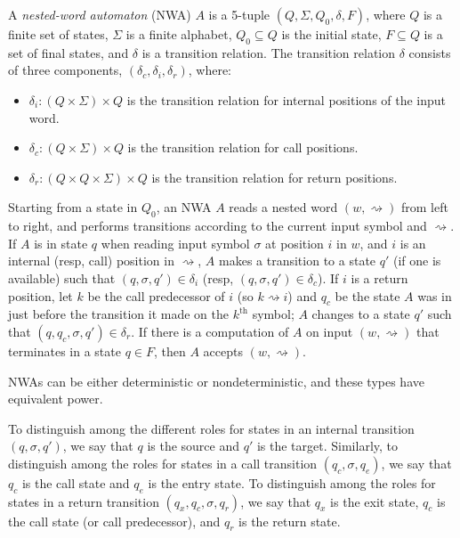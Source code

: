 \begin{definition}
  \label{De:NWA}

  A \textsl{nested-word automaton} (NWA) $A$ is a 5-tuple $(Q, \Sigma, Q_0,
  \delta, F)$, where $Q$ is a finite set of states, $\Sigma$ is a finite
  alphabet, $Q_0 \subseteq Q$ is the initial state, $F \subseteq Q$ is a set of
  final states, and $\delta$ is a transition relation. The transition
  relation $\delta$ consists of three components, $(\delta_c, \delta_i,
  \delta_r)$, where:
  \begin{itemize}
    \item
      $\delta_i: (Q \times \Sigma) \times Q$ is the transition relation for
      internal positions of the input word.
    \item
      $\delta_c: (Q \times \Sigma) \times Q$ is the transition relation for
      call positions.
    \item
      $\delta_r: (Q \times Q \times \Sigma) \times Q$ is the transition
      relation for return positions.
  \end{itemize}

  Starting from a state in $Q_0$, an NWA $A$ reads a nested word $(w,\rightsquigarrow)$
  from left to right, and performs transitions according to the current input
  symbol and $\rightsquigarrow$.  If $A$ is in state $q$ when reading input
  symbol $\sigma$ at position $i$ in $w$, and $i$ is an internal (resp, call)
  position in $\rightsquigarrow$, $A$ makes a transition to a state $q'$ (if
  one is available) such that $(q,\sigma,q')\in\delta_i$ (resp,
  $(q,\sigma,q')\in\delta_c$).  If $i$ is a return position, let $k$ be the
  call predecessor of $i$ (so $k \rightsquigarrow i$) and $q_c$ be the state
  $A$ was in just before the transition it made on the $k^{\textrm{th}}$
  symbol; $A$ changes to a state $q'$ such that $(q,q_c,\sigma,q')
  \in\delta_r$. If there is a computation of $A$ on input
  $(w,\rightsquigarrow)$ that terminates in a state $q\in F$, then $A$
  accepts $(w,\rightsquigarrow)$.

  NWAs can be either deterministic or nondeterministic, and these types have
  equivalent power.
\end{definition}


To distinguish among the different roles for states in an internal
transition $(q,\sigma,q')$, we say that $q$ is the source and $q'$ is the
target.  Similarly, to distinguish among the roles for states in a call
transition $(q_c,\sigma,q_e)$, we say that $q_c$ is the call state and $q_e$
is the entry state. To distinguish among the roles for states in a return
transition $(q_x,q_c,\sigma,q_r)$, we say that $q_x$ is the exit state,
$q_c$ is the call state (or call predecessor), and $q_r$ is the return state.
